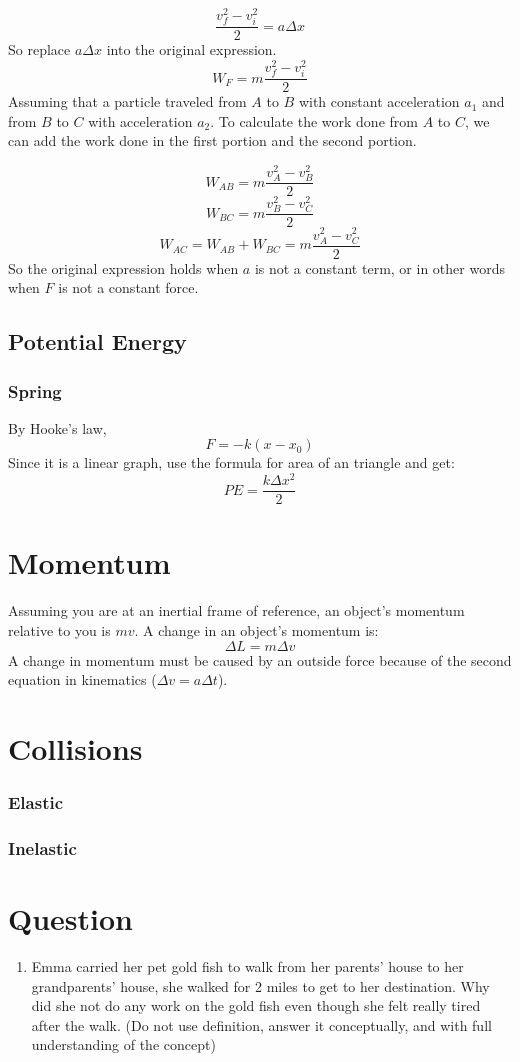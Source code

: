 \documentclass[]{article}
\begin{document}
	$$\frac{v_f^2 - v^2_i}{2} = a\Delta x$$
	So replace $a\Delta x$ into the original expression.
	$$W_F = m \frac{v_f^2 - v^2_i}{2}$$
	Assuming that a particle traveled from $A$ to $B$ with constant acceleration $a_1$ and from $B$ to $C$ with acceleration $a_2$. To calculate the work done from $A$ to $C$, we can add the work done in the first portion and the second portion.
	
	$$W_{AB} = m\frac{v_A^2 -v_B^2}{2}$$
	$$W_{BC} = m\frac{v_B^2 -v_C^2}{2}$$ 
	$$W_{AC} = W_{AB} + W_{BC} = m\frac{v_A^2 -v_C^2}{2}$$
	So the original expression holds when $a$ is not a constant term, or in other words when $F$ is not a constant force. 
	\subsection{Potential Energy}
		\subsubsection{Spring}
			By Hooke's law, 
			$$F = -k (x-x_0)$$
			Since it is a linear graph, use the formula for area of an triangle and get:
				$$PE = \frac{k\Delta x^2}{2}$$	

		
\section{Momentum}
Assuming you are at an inertial frame of reference, an object's momentum relative to you is $mv$. A change in an object's momentum is:
$$\Delta L = m \Delta v$$
A change in momentum must be caused by an outside force because of the second equation in kinematics ($\Delta v = a\Delta t$).

\section{Collisions}
\subsubsection{Elastic}
\subsubsection{Inelastic}


\section{Question}
\begin{enumerate}
	\item Emma carried her pet gold fish to walk from her parents' house to her grandparents' house, she walked for 2 miles to get to her destination. Why did she not do any work on the gold fish even though she felt really tired after the walk. (Do not use definition, answer it conceptually, and with full understanding of the concept)
\end{enumerate}
\end{document}
